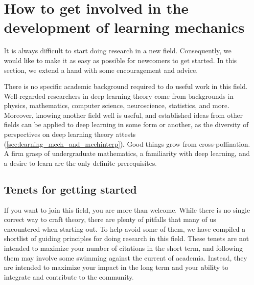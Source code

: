 \section{How to get involved in the development of learning mechanics}
\label{sec:how_to_get_involved}

It is always difficult to start doing research in a new field.
Consequently, we would like to make it as easy as possible for newcomers to get started.
In this section, we extend a hand with some encouragement and advice.

There is no specific academic background required to do useful work in this field.
Well-regarded researchers in deep learning theory come from backgrounds in physics, mathematics, computer science, neuroscience, statistics, and more.
Moreover, knowing another field well is useful, and established ideas from other fields can be applied to deep learning in some form or another, as the diversity of perspectives on deep learning theory attests (\cref{sec:learning_mech_and_mechinterp}).
Good things grow from cross-pollination.
A firm grasp of undergraduate mathematics, a familiarity with deep learning, and a desire to learn are the only definite prerequisites.

\subsection{Tenets for getting started}
If you want to join this field, you are more than welcome.
While there is no single correct way to craft theory, there are plenty of pitfalls that many of us encountered when starting out.
To help avoid some of them, we have compiled a shortlist of guiding principles for doing research in this field.
These tenets are not intended to maximize your number of citations in the short term, and following them may involve some swimming against the current of academia.
Instead, they are intended to maximize your impact in the long term and your ability to integrate and contribute to the community.

